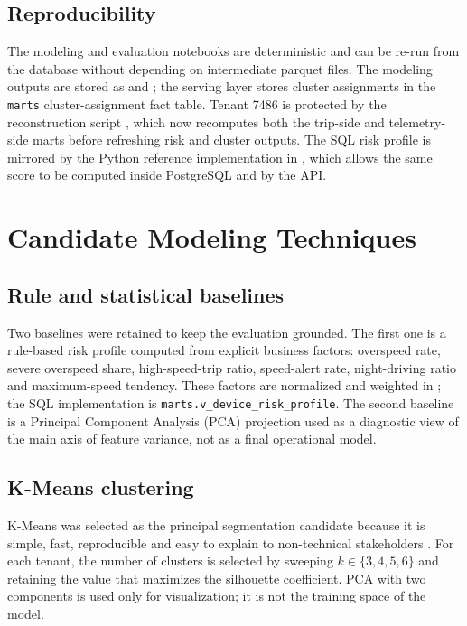 \subsection{Reproducibility}
The modeling and evaluation notebooks are deterministic and can be re-run from the database without depending on intermediate parquet files. The modeling outputs are stored as  and ; the serving layer stores cluster assignments in the \texttt{marts} cluster-assignment fact table. Tenant 7486 is protected by the reconstruction script , which now recomputes both the trip-side and telemetry-side marts before refreshing risk and cluster outputs. The SQL risk profile is mirrored by the Python reference implementation in , which allows the same score to be computed inside PostgreSQL and by the API.

\section{Candidate Modeling Techniques}

\subsection{Rule and statistical baselines}
Two baselines were retained to keep the evaluation grounded. The first one is a rule-based risk profile computed from explicit business factors: overspeed rate, severe overspeed share, high-speed-trip ratio, speed-alert rate, night-driving ratio and maximum-speed tendency. These factors are normalized and weighted in ; the SQL implementation is \texttt{marts.v\_device\_risk\_profile}. The second baseline is a Principal Component Analysis (PCA) projection used as a diagnostic view of the main axis of feature variance, not as a final operational model.

\subsection{K-Means clustering}
K-Means was selected as the principal segmentation candidate because it is simple, fast, reproducible and easy to explain to non-technical stakeholders \cite{macqueen1967kmeans}. For each tenant, the number of clusters is selected by sweeping $k \in \{3,4,5,6\}$ and retaining the value that maximizes the silhouette coefficient. PCA with two components is used only for visualization; it is not the training space of the model.

